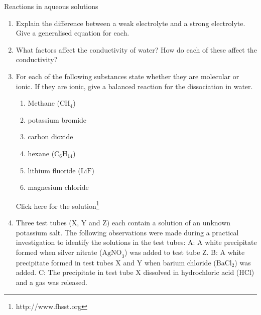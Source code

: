 \begin{eocexercises}{Reactions in aqueous solutions}
\begin{enumerate}[noitemsep, label=\textbf{\arabic*}. ]
\begin{enumerate}[noitemsep, label=\textbf{\alph*}. ]
(IEB Paper 2, 2003)
\label{m38719*uid119}\item The following substances are dissolved in water. Which one of the solutions is basic?
\label{m38719*id343275}\begin{enumerate}[noitemsep, label=\textbf{\roman*}. ] 
            \label{m38719*uid120}\item sodium nitrate
\label{m38719*uid121}\item calcium sulphate
\label{m38719*uid122}\item ammonium chloride
\label{m38719*uid123}\item potassium carbonate
\end{enumerate}
(IEB Paper 2, 2005)
\end{enumerate}
        \item Explain the difference between a weak electrolyte and a strong electrolyte. Give a generalised equation for each.\newline
            \item What factors affect the conductivity of water? How do each of these affect the conductivity?\newline
            \item For each of the following substances state whether they are molecular or ionic. If they are ionic, give a balanced reaction for the dissociation in water.\label{m38719*id7342}\begin{enumerate}[noitemsep, label=\textbf{\alph*}. ] 
            \item Methane (${\mathrm{CH}}_{4}$)\item potassium bromide\item carbon dioxide\item hexane (${\mathrm{C}}_{6}{\mathrm{H}}_{14}$)\item lithium fluoride ($\mathrm{LiF}$)\item magnesium chloride\end{enumerate}
        Click here for the solution\footnote{http://www.fhsst.org}
\label{m38719*uid127}\item Three test tubes (X, Y and Z) each contain a solution of an unknown potassium salt. The following observations were made during a practical investigation to identify the solutions in the test tubes:
A: A white precipitate formed when silver nitrate (${\mathrm{AgNO}}_{3}$) was added to test tube Z.
B: A white precipitate formed in test tubes X and Y when barium chloride (${\mathrm{BaCl}}_{2}$) was added.
C: The precipitate in test tube X dissolved in hydrochloric acid ($\mathrm{HCl}$) and a gas was released.

\end{enumerate}
\end{eocexercises}

